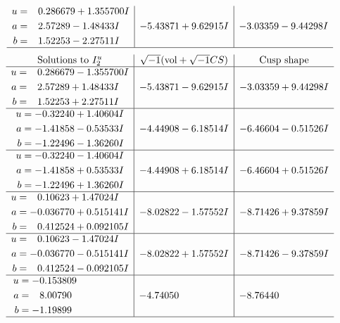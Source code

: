 \documentclass[1p]{elsarticle_modified}
\theoremstyle{definition}
\newcommand{\I}{\sqrt{-1}}
\begin{document}
$$\begin{array}{c|c|c}
\begin{aligned}
u &= \phantom{-}0.286679 + 1.355700 I \\
a &= \phantom{-}2.57289 - 1.48433 I \\
b &= \phantom{-}1.52253 - 2.27511 I\end{aligned}
 & -5.43871 + 9.62915 I & -3.03359 - 9.44298 I\\
 \hline 
 \end{array}$$\newpage$$\begin{array}{c|c|c}  
\text{Solutions to }I^u_{2}& \I (\text{vol} + \sqrt{-1}CS) & \text{Cusp shape}\\
 \hline 
\begin{aligned}
u &= \phantom{-}0.286679 - 1.355700 I \\
a &= \phantom{-}2.57289 + 1.48433 I \\
b &= \phantom{-}1.52253 + 2.27511 I\end{aligned}
 & -5.43871 - 9.62915 I & -3.03359 + 9.44298 I \\ \hline\begin{aligned}
u &= -0.32240 + 1.40604 I \\
a &= -1.41858 - 0.53533 I \\
b &= -1.22496 - 1.36260 I\end{aligned}
 & -4.44908 - 6.18514 I & -6.46604 - 0.51526 I \\ \hline\begin{aligned}
u &= -0.32240 - 1.40604 I \\
a &= -1.41858 + 0.53533 I \\
b &= -1.22496 + 1.36260 I\end{aligned}
 & -4.44908 + 6.18514 I & -6.46604 + 0.51526 I \\ \hline\begin{aligned}
u &= \phantom{-}0.10623 + 1.47024 I \\
a &= -0.036770 + 0.515141 I \\
b &= \phantom{-}0.412524 + 0.092105 I\end{aligned}
 & -8.02822 - 1.57552 I & -8.71426 + 9.37859 I \\ \hline\begin{aligned}
u &= \phantom{-}0.10623 - 1.47024 I \\
a &= -0.036770 - 0.515141 I \\
b &= \phantom{-}0.412524 - 0.092105 I\end{aligned}
 & -8.02822 + 1.57552 I & -8.71426 - 9.37859 I \\ \hline\begin{aligned}
u &= -0.153809\phantom{ +0.000000I} \\
a &= \phantom{-}8.00790\phantom{ +0.000000I} \\
b &= -1.19899\phantom{ +0.000000I}\end{aligned}
 & -4.74050\phantom{ +0.000000I} & -8.76440\phantom{ +0.000000I}\\
 \hline 
 \end{array}$$\newpage
\end{document}
